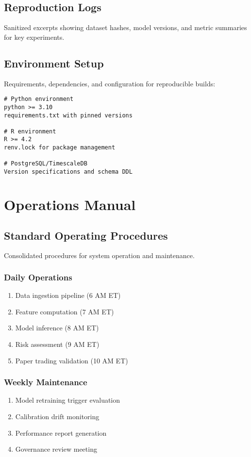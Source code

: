 \section{Reproduction Logs}
Sanitized excerpts showing dataset hashes, model versions, and metric summaries for key experiments.

\section{Environment Setup}
Requirements, dependencies, and configuration for reproducible builds:

\begin{verbatim}
# Python environment
python >= 3.10
requirements.txt with pinned versions

# R environment
R >= 4.2
renv.lock for package management

# PostgreSQL/TimescaleDB
Version specifications and schema DDL
\end{verbatim}

\chapter{Operations Manual}

\section{Standard Operating Procedures}
Consolidated procedures for system operation and maintenance.

\subsection{Daily Operations}
\begin{enumerate}
  \item Data ingestion pipeline (6 AM ET)
  \item Feature computation (7 AM ET)
  \item Model inference (8 AM ET)
  \item Risk assessment (9 AM ET)
  \item Paper trading validation (10 AM ET)
\end{enumerate}

\subsection{Weekly Maintenance}
\begin{enumerate}
  \item Model retraining trigger evaluation
  \item Calibration drift monitoring
  \item Performance report generation
  \item Governance review meeting
\end{enumerate}

